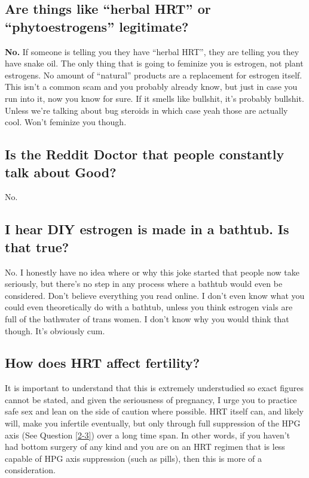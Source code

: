 \documentclass{article}
\begin{document}
\subsection{Are things like “herbal HRT” or “phytoestrogens” legitimate?}

\textbf{No.} If someone is telling you they have “herbal HRT”, they are telling you they have snake oil. The only thing that is going to feminize you is estrogen, not plant estrogens. No amount of “natural” products are a replacement for estrogen itself. This isn’t a common scam and you probably already know, but just in case you run into it, now you know for sure. If it smells like bullshit, it’s probably bullshit. Unless we’re talking about bug steroids in which case yeah those are actually cool. Won’t feminize you though.

\subsection{Is the Reddit Doctor that people constantly talk about Good?}

No.

\subsection{I hear DIY estrogen is made in a bathtub. Is that true?}

No. I honestly have no idea where or why this joke started that people now take seriously, but there’s no step in any process where a bathtub would even be considered. Don’t believe everything you read online. I don’t even know what you could even theoretically do with a bathtub, unless you think estrogen vials are full of the bathwater of trans women. I don’t know why you would think that though. It’s obviously cum.

\subsection{How does HRT affect fertility?}\label{11-42}

It is important to understand that this is extremely understudied so exact figures cannot be stated, and given the seriousness of pregnancy, I urge you to practice safe sex and lean on the side of caution where possible. HRT itself can, and likely will, make you infertile eventually, but only through full suppression of the HPG axis (See Question \ref{2-3}) over a long time span. In other words, if you haven't had bottom surgery of any kind and you are on an HRT regimen that is less capable of HPG axis suppression (such as pills), then this is more of a consideration.
\end{document}
